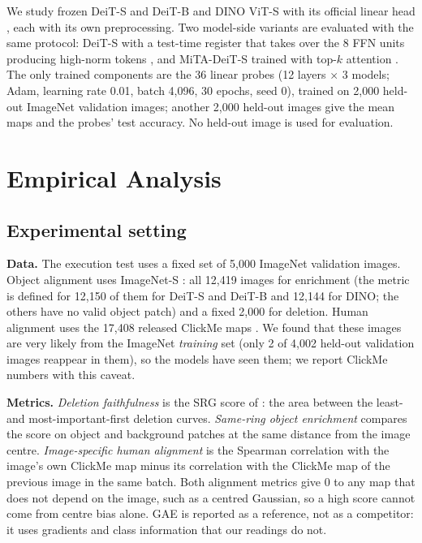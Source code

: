 \documentclass{article}
\begin{document}
We study frozen DeiT-S and DeiT-B \citep{touvron2021} and DINO ViT-S with its official linear head \citep{caron2021}, each with its own preprocessing. Two model-side variants are evaluated with the same protocol: DeiT-S with a test-time register that takes over the 8 FFN units producing high-norm tokens \citep{jiang2025}, and MiTA-DeiT-S trained with top-$k$ attention \citep{wen2026}. The only trained components are the 36 linear probes (12 layers $\times$ 3 models; Adam, learning rate 0.01, batch 4,096, 30 epochs, seed 0), trained on 2,000 held-out ImageNet validation images; another 2,000 held-out images give the mean maps and the probes' test accuracy. No held-out image is used for evaluation.

\section{Empirical Analysis}

\subsection{Experimental setting}

\textbf{Data.} The execution test uses a fixed set of 5,000 ImageNet validation images. Object alignment uses ImageNet-S \citep{gao2022}: all 12,419 images for enrichment (the metric is defined for 12,150 of them for DeiT-S and DeiT-B and 12,144 for DINO; the others have no valid object patch) and a fixed 2,000 for deletion. Human alignment uses the 17,408 released ClickMe maps \citep{linsley2019,fel2022}. We found that these images are very likely from the ImageNet \emph{training} set (only 2 of 4,002 held-out validation images reappear in them), so the models have seen them; we report ClickMe numbers with this caveat.

\textbf{Metrics.} \emph{Deletion faithfulness} is the SRG score of \citet{bluecher2024}: the area between the least- and most-important-first deletion curves. \emph{Same-ring object enrichment} compares the score on object and background patches at the same distance from the image centre. \emph{Image-specific human alignment} is the Spearman correlation with the image's own ClickMe map minus its correlation with the ClickMe map of the previous image in the same batch. Both alignment metrics give 0 to any map that does not depend on the image, such as a centred Gaussian, so a high score cannot come from centre bias alone. GAE \citep{chefer2021} is reported as a reference, not as a competitor: it uses gradients and class information that our readings do not.
\end{document}
